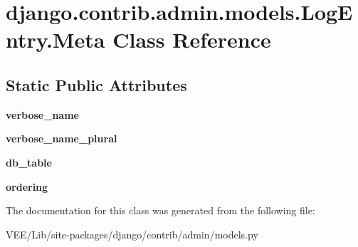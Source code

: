 \hypertarget{classdjango_1_1contrib_1_1admin_1_1models_1_1_log_entry_1_1_meta}{}\section{django.\+contrib.\+admin.\+models.\+Log\+Entry.\+Meta Class Reference}
\label{classdjango_1_1contrib_1_1admin_1_1models_1_1_log_entry_1_1_meta}
\subsection*{Static Public Attributes}
\begin{DoxyCompactItemize}
\item 
\mbox{\label{classdjango_1_1contrib_1_1admin_1_1models_1_1_log_entry_1_1_meta_ae0c6f193f1755feb4579558ccdd4e300}} 
{\bfseries verbose\+\_\+name}
\item 
\mbox{\label{classdjango_1_1contrib_1_1admin_1_1models_1_1_log_entry_1_1_meta_a8472db25155bd4191a03ce48b79e1af5}} 
{\bfseries verbose\+\_\+name\+\_\+plural}
\item 
\mbox{\label{classdjango_1_1contrib_1_1admin_1_1models_1_1_log_entry_1_1_meta_a03806a36a0f8db47338be16bd890d97c}} 
{\bfseries db\+\_\+table}
\item 
\mbox{\label{classdjango_1_1contrib_1_1admin_1_1models_1_1_log_entry_1_1_meta_a9d878193d2c8c40c75713258aad17084}} 
{\bfseries ordering}
\end{DoxyCompactItemize}


The documentation for this class was generated from the following file\+:\begin{DoxyCompactItemize}
\item 
V\+E\+E/\+Lib/site-\/packages/django/contrib/admin/models.\+py\end{DoxyCompactItemize}
